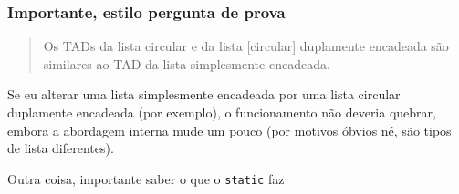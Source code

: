 \documentclass[11pt]{article}
\begin{document}
\subsubsection{Importante, estilo pergunta de prova}
\label{sec:org9b06136}
\begin{quote}
Os TADs da lista circular e da lista [circular] duplamente encadeada
são similares ao TAD da lista simplesmente encadeada.
\end{quote}

Se eu alterar uma lista simplesmente encadeada por uma lista circular duplamente encadeada (por exemplo), o funcionamento não deveria quebrar, embora a abordagem interna mude um pouco (por motivos óbvios né, são tipos de lista diferentes).

Outra coisa, importante saber o que o \texttt{static} faz
\end{document}
